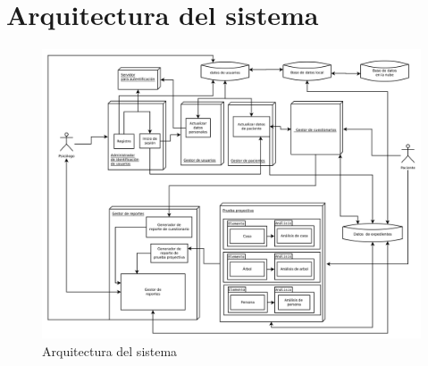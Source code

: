 \section{Arquitectura del sistema}
\begin{figure}[H]
\centering
\includegraphics[width=1\textwidth]{imagenes/arqui}
\caption{Arquitectura del sistema}
\label{img:arqsis}
\end{figure}